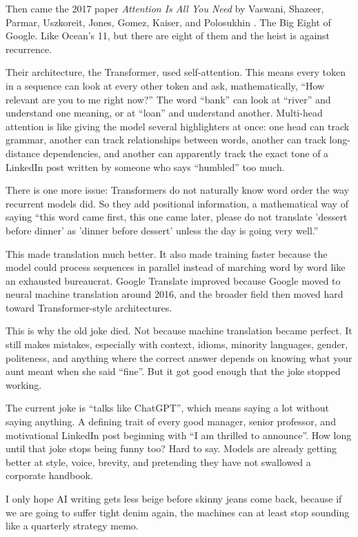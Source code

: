 \documentclass[12pt,oneside]{book}
\begin{document}
Then came the 2017 paper \emph{Attention Is All You Need} by Vaswani, Shazeer, Parmar, Uszkoreit, Jones, Gomez, Kaiser, and Polosukhin \parencite{vaswani2017}. The Big Eight of Google. Like Ocean's 11, but there are eight of them and the heist is against recurrence.

Their architecture, the Transformer, used self-attention. This means every token in a sequence can look at every other token and ask, mathematically, ``How relevant are you to me right now?'' The word ``bank'' can look at ``river'' and understand one meaning, or at ``loan'' and understand another. Multi-head attention is like giving the model several highlighters at once: one head can track grammar, another can track relationships between words, another can track long-distance dependencies, and another can apparently track the exact tone of a LinkedIn post written by someone who says ``humbled'' too much.

There is one more issue: Transformers do not naturally know word order the way recurrent models did. So they add positional information, a mathematical way of saying ``this word came first, this one came later, please do not translate 'dessert before dinner' as 'dinner before dessert' unless the day is going very well.''

This made translation much better. It also made training faster because the model could process sequences in parallel instead of marching word by word like an exhausted bureaucrat. Google Translate improved because Google moved to neural machine translation around 2016, and the broader field then moved hard toward Transformer-style architectures.

This is why the old joke died. Not because machine translation became perfect. It still makes mistakes, especially with context, idioms, minority languages, gender, politeness, and anything where the correct answer depends on knowing what your aunt meant when she said ``fine''. But it got good enough that the joke stopped working.

The current joke is ``talks like ChatGPT'', which means saying a lot without saying anything. A defining trait of every good manager, senior professor, and motivational LinkedIn post beginning with ``I am thrilled to announce''. How long until that joke stops being funny too? Hard to say. Models are already getting better at style, voice, brevity, and pretending they have not swallowed a corporate handbook.

I only hope AI writing gets less beige before skinny jeans come back, because if we are going to suffer tight denim again, the machines can at least stop sounding like a quarterly strategy memo.
\end{document}
